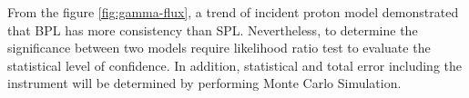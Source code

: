 From the figure \ref{fig:gamma-flux}, a trend of incident proton model
demonstrated that BPL has more consistency than SPL. Nevertheless,
to determine the significance between two models require likelihood
ratio test to evaluate the statistical level of confidence. In addition,
statistical and total error including the instrument will be determined
by performing Monte Carlo Simulation.



